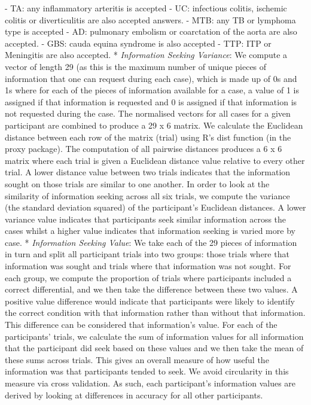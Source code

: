 \documentclass[a4paper, nobind]{templates/ociamthesis}
\begin{document}
- TA: any inflammatory arteritis is accepted
- UC: infectious colitis, ischemic colitis or diverticulitis are also accepted answers.
- MTB: any TB or lymphoma type is accepted
- AD: pulmonary embolism or coarctation of the aorta are also accepted.
- GBS: cauda equina syndrome is also accepted
- TTP: ITP or Meningitis are also accepted.
* \emph{Information Seeking Variance}: We compute a vector of length 29 (as this is the maximum number of unique pieces of information that one can request during each case), which is made up of 0s and 1s where for each of the pieces of information available for a case, a value of 1 is assigned if that information is requested and 0 is assigned if that information is not requested during the case. The normalised vectors for all cases for a given participant are combined to produce a 29 x 6 matrix. We calculate the Euclidean distance between each row of the matrix (trial) using R's dist function (in the proxy package). The computation of all pairwise distances produces a 6 x 6 matrix where each trial is given a Euclidean distance value relative to every other trial. A lower distance value between two trials indicates that the information sought on those trials are similar to one another. In order to look at the similarity of information seeking across all six trials, we compute the variance (the standard deviation squared) of the participant's Euclidean distances. A lower variance value indicates that participants seek similar information across the cases whilst a higher value indicates that information seeking is varied more by case.
* \emph{Information Seeking Value}: We take each of the 29 pieces of information in turn and split all participant trials into two groups: those trials where that information was sought and trials where that information was not sought. For each group, we compute the proportion of trials where participants included a correct differential, and we then take the difference between these two values. A positive value difference would indicate that participants were likely to identify the correct condition with that information rather than without that information. This difference can be considered that information's value. For each of the participants' trials, we calculate the sum of information values for all information that the participant did seek based on these values and we then take the mean of these sums across trials. This gives an overall measure of how useful the information was that participants tended to seek. We avoid circularity in this measure via cross validation. As such, each participant's information values are derived by looking at differences in accuracy for all other participants.
\end{document}
